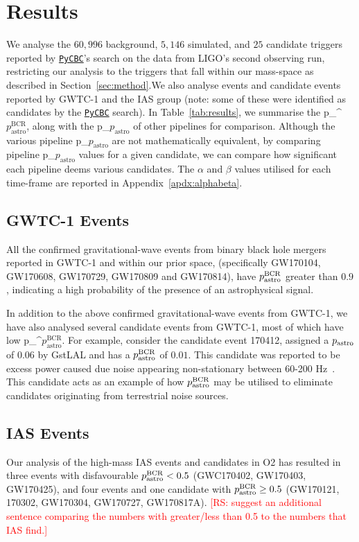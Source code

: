 \documentclass[%
 nofootinbib,
 amsmath,amssymb,
 aps,
 twocolumn
]{revtex4-2}
\newcommand{\gstlal}{{\sc GstLAL}\xspace}
\newcommand{\pycbc}{{\sc \href{https://pycbc.org/}{\texttt{PyCBC}}}\xspace}
\newcommand{\fancytext}[1]{{\relax\ifmmode#1\else $#1$\fi}\xspace}
\newcommand{\pastro}{\fancytext{p_\text{astro}}}
\newcommand{\pastrobcr}{\fancytext{p_\text{astro}^{\text{BCR}}}}
\newcommand{\rs}[1]{\textcolor{red}{[RS: #1]}}
\begin{document}
\section{\label{sec:Results}Results}


We analyse the $60,996$ background, $5,146$ simulated, and $25$ candidate triggers reported by \pycbc's search on the data from LIGO's second observing run, restricting our analysis to the triggers that fall within our mass-space as described in Section~\ref{sec:method}.We also analyse events and candidate events reported by GWTC-1 and the IAS group (note: some of these were identified as candidates by the \pycbc search). In Table~\ref{tab:results}, we summarise the \pastrobcr, along with the \pastro of other pipelines for comparison. Although the various pipeline \pastro are not mathematically equivalent, by comparing pipeline \pastro values for a given candidate, we can compare how significant each pipeline deems various candidates. The $\alpha$ and $\beta$ values utilised for each time-frame are reported in Appendix~\ref{apdx:alphabeta}.

\subsection{GWTC-1 Events}
All the confirmed gravitational-wave events from binary black hole mergers reported in GWTC-1 and within our prior space, (specifically GW170104, GW170608, GW170729, GW170809 and GW170814), have $\pastrobcr$ greater than $0.9$, indicating a high probability of the presence of an astrophysical signal. 

In addition to the above confirmed gravitational-wave events from GWTC-1, we have also analysed several candidate events from GWTC-1, most of which have low \pastrobcr. For example, consider the candidate event 170412, assigned a $\pastro$ of $0.06$ by \gstlal and has a $\pastrobcr$ of $0.01$. This candidate was reported to be excess power caused due noise appearing non-stationary between 60-200 Hz~\cite{GWTC1}. This candidate acts as an example of how $\pastrobcr$ may be utilised to eliminate candidates originating from terrestrial noise sources.

\subsection{IAS Events}
Our analysis of the high-mass IAS events and candidates in O2 has resulted in three events with disfavourable $\pastrobcr<0.5$ (GWC170402, GW170403, GW170425), and four events and one candidate with $\pastrobcr\geq0.5$ (GW170121, 170302, GW170304, GW170727, GW170817A). \rs{suggest an additional sentence comparing the numbers with greater/less than 0.5 to the numbers that IAS find.}
\end{document}
